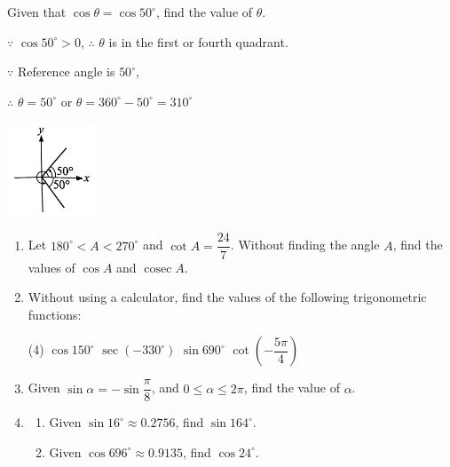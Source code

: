 \documentclass{report}
\begin{document}
\begin{question}
    \begin{multicols}{2}
        Given that $\cos\theta = \cos 50^\circ$, find the value of $\theta$.

    \sol{}

    \vspace{-0.5em}
    \noindent $\because$ $\cos 50^\circ > 0$, $\therefore$ $\theta$ is in the first or fourth quadrant.
    
    \vspace{-1em}
    \noindent $\because$ Reference angle is $50^\circ$,

    \vspace{-1em}
    \noindent $\therefore$ $\theta = 50^\circ$ or $\theta = 360^\circ - 50^\circ = 310^\circ$

    \begin{center}
        \includegraphics[width=0.2\textwidth]{assets/9-17.jpg}
    \end{center}
    \end{multicols}
\end{question}

\begin{enumerate}
    \item Let $180^\circ < A < 270^\circ$ and $\cot A = \dfrac{24}{7}$. Without finding the angle $A$, find the values of $\cos A$ and $\operatorname{cosec} A$.

    \item Without using a calculator, find the values of the following trigonometric functions:
    \begin{tasks}[label=(\alph*)](4)
        \task $\cos 150^\circ$
        \task $\sec (-330^\circ)$
        \task $\sin 690^\circ$
        \task \vspace*{-1.8em} $\cot \left(-\dfrac{5 \pi}{4}\right)$
    \end{tasks}

    \item Given $\sin \alpha = -\sin \dfrac{\pi}{8}$, and $0 \leq \alpha \leq 2 \pi$, find the value of $\alpha$.

\item \begin{enumerate}[label=(\alph*)]
\item Given $\sin 16^\circ \approx 0.2756$, find $\sin 164^\circ$.
\item Given $\cos 696^\circ \approx 0.9135$, find $\cos 24^\circ$.
\end{enumerate}
\end{enumerate}
\end{document}
